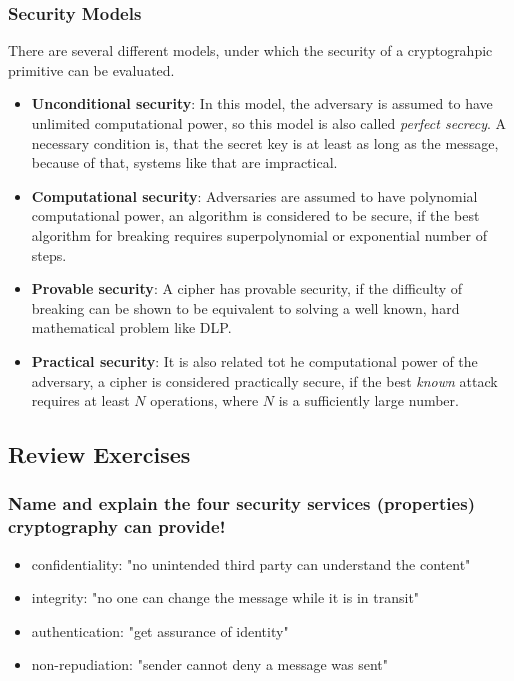 \documentclass[a4paper, 10 pt, conference]{ieeeconf}
\begin{document}
\subsubsection{\textbf{Security Models}}
There are several different models, under which the security of a cryptograhpic primitive can be evaluated. 
\label{ex:secmod}
\begin{itemize}
\item \textbf{Unconditional security}: In this model, the adversary is assumed to have unlimited computational power, so this model is also called \emph{perfect secrecy}. A necessary condition is, that the secret key is at least as long as the message, because of that, systems like that are impractical. 
\item \textbf{Computational security}: Adversaries are assumed to have polynomial computational power, an algorithm is considered to be secure, if the best algorithm for breaking requires superpolynomial or exponential number of steps. 
\item \textbf{Provable security}: A cipher has provable security, if the difficulty of breaking can be shown to be equivalent to solving a well known, hard mathematical problem like DLP. 
\item \textbf{Practical security}: It is also related tot he computational power of the adversary, a cipher is considered practically secure, if the best \emph{known} attack requires at least $N$ operations, where $N$ is a sufficiently large number. 
\end{itemize}

\pagebreak 
\subsection{\textbf{Review Exercises}}

\subsubsection{\textbf{Name and explain the four security services (properties) cryptography can provide!}}
\begin{itemize}
\item confidentiality: "no unintended third party can understand the content"
\item integrity: "no one can change the message while it is in transit"
\item authentication: "get assurance of identity"
\item non-repudiation: "sender cannot deny a message was sent"
\end{itemize}
\end{document}
